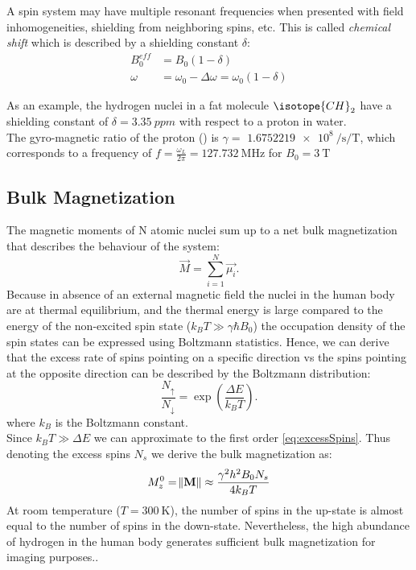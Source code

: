 A spin system may have multiple resonant frequencies when presented with field inhomogeneities, shielding from neighboring spins, etc. This is called \textit{chemical shift} which is described by a shielding constant $\delta$:
\begin{equation}\label{eq:chemicalShift}
\begin{split}
B_{0}^{eff} &= B_0 (1-\delta) \\
\omega &= \omega_0 - \Delta\omega = \omega_0 (1-\delta) 
\end{split}
\end{equation} 

As an example, the hydrogen nuclei in a fat molecule $\isotope{CH}_2$ have a shielding constant of $\delta = \SI{3.35}{ppm}$ with respect to a proton in water.\\

The gyro-magnetic ratio of the proton () is $\gamma =$ $\SI{1.6752219e+8}{\per \second\per \tesla}$, which corresponds to a frequency of $f = \frac{\omega_L}{2\pi}=\SI{127.732}{\mega\hertz}$ for $B_0 = \SI{3}{\tesla}$

\subsection{Bulk Magnetization}
The magnetic moments of N atomic nuclei sum up to a net bulk magnetization that describes the behaviour of the system:
\begin{equation}
\vec{M} = \sum_{i=1}^N \vec{\mu_i}.
\end{equation}
Because in absence of an external magnetic field the nuclei in the human body are at thermal equilibrium, and the thermal energy is large compared to the energy of the non-excited spin state ($k_B T \gg \gamma \hbar B_0$) the occupation density of the spin states can be expressed using Boltzmann statistics. Hence, we can derive that the excess rate of spins pointing on a specific direction vs the spins pointing at the opposite direction can be described by the Boltzmann distribution:
\begin{equation}\label{eq:excessSpins}
\frac{N_\uparrow}{N_\downarrow} = \exp (\frac{\Delta E}{k_B T}). 
\end{equation}
where $k_B$ is the Boltzmann constant.\\

Since $k_B T \gg \Delta E$ we can approximate to the first order \autoref{eq:excessSpins}. Thus denoting the excess spins $N_s$ we derive the bulk magnetization as:
\begin{equation}\label{eq:bulkMagnetization}
M_{z}^{0} = \norm{\mathbf{M}} \approx \frac{\gamma^2 h^2 B_0 N_s}{4 k_B T}
\end{equation}
At room temperature ($T = \SI{300}{\kelvin}$), the number of spins in the up-state is almost equal to the number of spins in the down-state. Nevertheless, the high abundance of hydrogen in the human body generates sufficient bulk magnetization for imaging purposes.\cite{aizada14}.

